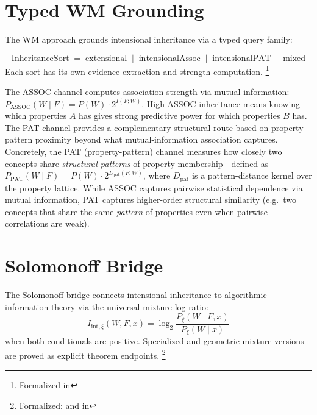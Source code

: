\documentclass[11pt,openany]{report}
\begin{document}
\section{Typed WM Grounding}

The WM approach grounds intensional inheritance via a typed query
family:

\begin{definition}
\[
  \mathrm{InheritanceSort} \;=\;
  \mathrm{extensional} \;\mid\;
  \mathrm{intensionalAssoc} \;\mid\;
  \mathrm{intensionalPAT} \;\mid\;
  \mathrm{mixed}
\]
Each sort has its own evidence extraction and strength computation.%
\footnote{Formalized in
}
\end{definition}

\noindent
The ASSOC channel computes association strength via mutual
information: $P_{\mathrm{ASSOC}}(W \mid F) = P(W) \cdot 2^{I(F; W)}$.
High ASSOC inheritance means knowing which properties $A$ has gives
strong predictive power for which properties $B$ has.  The PAT
channel provides a complementary structural route based on
property-pattern proximity beyond what mutual-information association
captures.  Concretely, the PAT (property-pattern) channel measures
how closely two concepts share \emph{structural patterns} of property
membership---defined as $P_{\mathrm{PAT}}(W \mid F) = P(W) \cdot
2^{D_{\mathrm{pat}}(F; W)}$, where $D_{\mathrm{pat}}$ is a
pattern-distance kernel over the property lattice.  While ASSOC
captures pairwise statistical dependence via mutual information, PAT
captures higher-order structural similarity (e.g.\ two concepts that
share the same \emph{pattern} of properties even when pairwise
correlations are weak).


\section{Solomonoff Bridge}

The Solomonoff bridge connects intensional inheritance to algorithmic
information theory via the universal-mixture log-ratio:
\[
  I_{\mathrm{int},\xi}(W, F, x) =
  \log_2 \frac{P_\xi(W \mid F, x)}{P_\xi(W \mid x)}
\]
when both conditionals are positive.  Specialized
 and geometric-mixture versions are proved as
explicit theorem endpoints.%
\footnote{Formalized:
 and
 in
}
\end{document}
